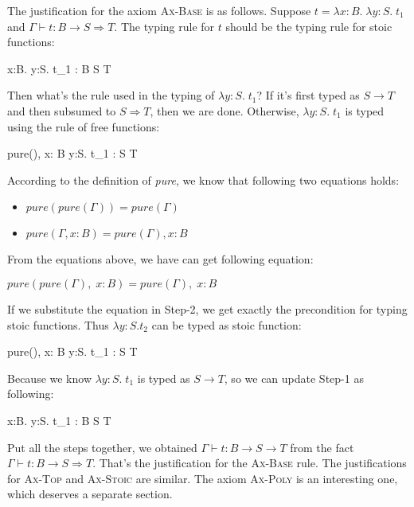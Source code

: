The justification for the axiom \textsc{Ax-Base} is as
follows. Suppose $t = \lambda x:B. \; \lambda y:S. \; t_1$ and
$\Gamma \vdash t : B \to S \Rightarrow T$. The typing rule for $t$
should be the typing rule for stoic functions:

{ \Gamma \vdash \lambda x:B. \lambda y:S. \; t_1 : B \to S \Rightarrow T }

Then what's the rule used in the typing of $\lambda y:S. \; t_1$? If it's
first typed as $S \to T$ and then subsumed to $S \Rightarrow T$, then
we are done. Otherwise, $\lambda y:S. \; t_1$ is typed using the rule of
free functions:

{ pure(\Gamma),\; x: B \vdash \lambda y:S. \; t_1 : S \Rightarrow T }

According to the definition of \emph{pure}, we know that following two
equations holds:

\begin{itemize}
\item $pure(pure(\Gamma)) = pure(\Gamma)$
\item $pure(\Gamma, x:B) = pure(\Gamma), x:B$
\end{itemize}

From the equations above, we have can get following equation:

\begin{center}
  $pure(pure(\Gamma),\; x: B) = pure(\Gamma),\; x: B$
\end{center}

If we substitute the equation in Step-2, we get exactly the
precondition for typing stoic functions. Thus $\lambda y:S.t_2$ can be
typed as stoic function:

{ pure(\Gamma),\; x: B \vdash \lambda y:S. \; t_1 : S \to T }

Because we know $\lambda y:S. \; t_1$ is typed as $S \to T$, so we can
update Step-1 as following:

{ \Gamma \vdash \lambda x:B. \lambda y:S. \; t_1 : B \to S \to T }

Put all the steps together, we obtained
$\Gamma \vdash t : B \to S \to T$ from the fact
$\Gamma \vdash t : B \to S \Rightarrow T$. That's the justification
for the \textsc{Ax-Base} rule. The justifications for \textsc{Ax-Top}
and \textsc{Ax-Stoic} are similar. The axiom \textsc{Ax-Poly} is an
interesting one, which deserves a separate section.

